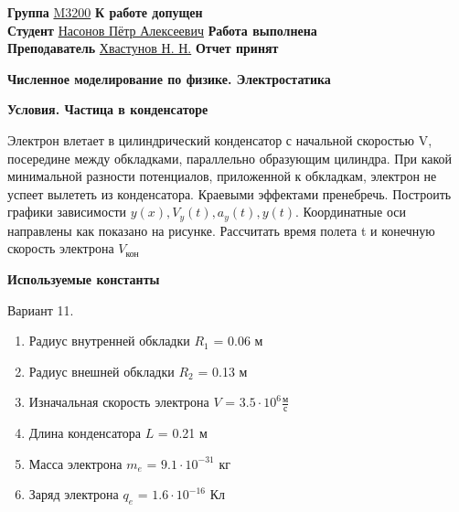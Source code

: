 \documentclass[12pt]{article}
\begin{document}
    \vspace*{2\baselineskip}

    \thispagestyle{fancy}

    \noindent
    \textbf{Группа} \underline{M3200} \hfill \textbf{К работе допущен} \underline{\hspace{4cm}} \\[0.5cm]
    \textbf{Студент} \underline{Насонов Пётр Алексеевич} \hfill \textbf{Работа выполнена} \underline{\hspace{4cm}} \\[0.5cm]
    \textbf{Преподаватель} \underline{Хвастунов Н. Н.} \hfill \textbf{Отчет принят} \underline{\hspace{4.85cm}} \\


    \begin{center}
    {\huge \textbf{Численное моделирование по физике. Электростатика}}

        \smallvspace

    \end{center}

    \begin{center}
        {\large \textbf{Условия. Частица в конденсаторе}} \\
    \end{center}

    Электрон влетает в цилиндрический конденсатор с начальной скоростью V, посередине между
обкладками, параллельно образующим цилиндра. При какой минимальной разности потенциалов,
приложенной к обкладкам, электрон не успеет вылететь из конденсатора. Краевыми эффектами
пренебречь.
Построить графики зависимости $ y(x), V_y(t), a_y(t), y(t)$. Координатные оси направлены как показано
на рисунке.
Рассчитать время полета t и конечную скорость электрона $V_\text{кон}$

    \large \textbf{Используемые константы} \normalsize

    Вариант 11.

    \normalsize
    \begin{enumerate}
        \item Радиус внутренней обкладки $R_1$ = 0.06 м
        \item Радиус внешней обкладки $R_2$ = 0.13 м
        \item Изначальная скорость электрона $V$ = $3.5 \cdot 10^6 \frac{\text{м}}{\text{с}}$
        \item Длина конденсатора $L$ = 0.21 м
        \item Масса электрона $m_e$ = $9.1 \cdot 10^{-31}$ кг
        \item  Заряд электрона $q_e$ = $1.6 \cdot 10^{-16}$ Кл
    \end{enumerate}
    
\end{document}

